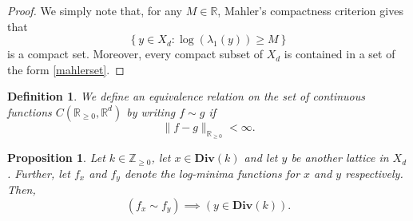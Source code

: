 \documentclass[reqno,11pt]{amsart}
\theoremstyle{plain}
\newtheorem{prop}[thm]{Proposition}
\newtheorem{defn}[thm]{Definition}
\theoremstyle{definition}
\theoremstyle{remark}
\numberwithin{equation}{section}
\newcommand{\D}{\mathbf{Div}}
\newcommand{\R}{{\mathbb{R}}}
\newcommand{\Z}{{\mathbb{Z}}}
\begin{document}
\begin{proof}
    We simply note that, for any $M \in \R$, Mahler's compactness criterion gives that
    \begin{equation}\label{mahlerset}
        \left\lbrace y \in X_d: \log(\lambda_1(y)) \geq M\right\rbrace
    \end{equation}
    is a compact set.
    Moreover, every compact subset of $X_d$ is contained in a set of the form \eqref{mahlerset}.
\end{proof} 
\begin{defn}
    We define an equivalence relation on the set of continuous functions $C(\R_{\geq 0}, \R^d)$ by writing $f \sim g$ if \begin{equation}\label{equivalence}
    \|f-g\|_{\R_{\geq 0}} < \infty.
\end{equation}
\end{defn}
\begin{prop}\label{k-div-invariance-fp}
Let $k \in \Z_{\geq 0}$, let $x \in \D(k)$ and let $y$ be another lattice in $X_d$. 
Further, let $f_x$ and $f_y$ denote the log-minima functions for $x$ and $y$ respectively. 
Then,
\begin{equation}
    \left(f_x \sim f_y\right) \implies \left(y \in \D(k)\right).
\end{equation}
\end{prop}
\end{document}
